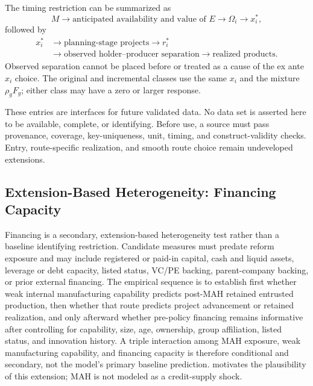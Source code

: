 \documentclass[12pt]{article}
\newcommand{\1}{\mathbf{1}}
\begin{document}
The timing restriction can be summarized as
\begin{equation}
  M
  \longrightarrow
  \text{anticipated availability and value of }E
  \longrightarrow
  \Omega_i
  \longrightarrow
  x_i^*,
  \label{eq:empirical-anticipated-chain}
\end{equation}
followed by
\begin{equation}
  \begin{aligned}
  x_i^*
  &\longrightarrow
  \text{planning-stage projects}
  \longrightarrow r_i^* \\
  &\longrightarrow
  \text{observed holder--producer separation}
  \longrightarrow
  \text{realized products}.
  \end{aligned}
  \label{eq:empirical-realized-chain}
\end{equation}
Observed separation cannot be placed before or treated as a cause of the ex
ante \(x_i\) choice. The original and incremental classes use the same
\(x_i\) and the mixture \(\rho_gF_g\); either class may have a zero or larger
response.

These entries are interfaces for future validated data. No data set is
asserted here to be available, complete, or identifying. Before use, a source
must pass provenance, coverage, key-uniqueness, unit, timing, and
construct-validity checks. Entry, route-specific realization, and smooth
route choice remain undeveloped extensions.

\subsection{Extension-Based Heterogeneity: Financing Capacity}

Financing is a secondary, extension-based heterogeneity test rather than a
baseline identifying restriction. Candidate measures must predate reform
exposure and may include registered or paid-in capital, cash and liquid
assets, leverage or debt capacity, listed status, VC/PE backing,
parent-company backing, or prior external financing. The empirical sequence
is to establish first whether weak internal manufacturing capability predicts
post-MAH retained entrusted production, then whether that route predicts
project advancement or retained realization, and only afterward whether
pre-policy financing remains informative after controlling for capability,
size, age, ownership, group affiliation, listed status, and innovation
history. A triple interaction among MAH exposure, weak manufacturing
capability, and financing capacity is therefore conditional and secondary,
not the model's primary baseline prediction. \citet{HallLerner2010} motivates
the plausibility of this extension; MAH is not modeled as a credit-supply
shock.
\end{document}
